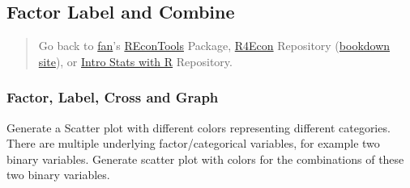\documentclass[
]{book}
\begin{document}
\begin{table}[!h]
\centering
{}
\end{table}

\hypertarget{factor-label-and-combine}{%
\subsection{Factor Label and Combine}\label{factor-label-and-combine}}

\begin{quote}
Go back to \href{http://fanwangecon.github.io/}{fan}'s \href{https://fanwangecon.github.io/REconTools/}{REconTools} Package, \href{https://fanwangecon.github.io/R4Econ/}{R4Econ} Repository (\href{https://fanwangecon.github.io/R4Econ/bookdown}{bookdown site}), or \href{https://fanwangecon.github.io/Stat4Econ/}{Intro Stats with R} Repository.
\end{quote}

\hypertarget{factor-label-cross-and-graph}{%
\subsubsection{Factor, Label, Cross and Graph}\label{factor-label-cross-and-graph}}

Generate a Scatter plot with different colors representing different categories. There are multiple underlying factor/categorical variables, for example two binary variables. Generate scatter plot with colors for the combinations of these two binary variables.
\end{document}
